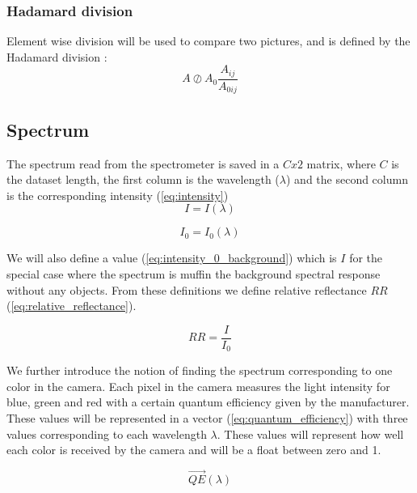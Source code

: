 \documentclass{article}
\begin{document}
\subsubsection{Hadamard division}
Element wise division will be used to compare two pictures, and is defined by the Hadamard division \cite{HadamardDivisionInfixed}:
\begin{equation}
    \label{eq:element_wise_division_image}
    A \oslash  A_0  \frac{A_{ij}}{A_{0ij} } %
\end{equation}


\subsection{Spectrum}
\label{sec:spectrum}

The spectrum read from the spectrometer is saved in a $C x 2$ matrix, where $C$ is the dataset length, the first column is the wavelength ($\lambda$) and the second column is the corresponding intensity (\ref{eq:intensity})
\begin{equation}
    \label{eq:intensity}
    I = I(\lambda)    
\end{equation}

\begin{equation}
    \label{eq:intensity_0_background}
    I_0 = I_0(\lambda)
\end{equation}

We will also define a value (\ref{eq:intensity_0_background}) which is $I$ for the special case where the spectrum is muffin the background spectral response without any objects. From these definitions we define relative reflectance $RR$ (\ref{eq:relative_reflectance}). 

\begin{equation}
    \label{eq:relative_reflectance}
    RR = \frac{I}{I_0}
\end{equation}


We further introduce the notion of finding the spectrum corresponding to one color in the camera. Each pixel in the camera measures the light intensity for blue, green and red with a certain quantum efficiency given by the manufacturer. These values will be represented in a vector (\ref{eq:quantum_efficiency}) with three values corresponding to each wavelength $\lambda$. These values will represent how well each color is received by the camera and will be a float between zero and 1. 

\begin{equation}
    \label{eq:quantum_efficiency}
    \vec{QE}(\lambda)    
\end{equation}
\end{document}
